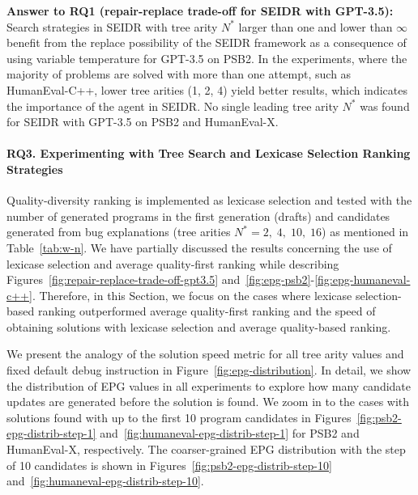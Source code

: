 \begin{framed}
\textbf{Answer to RQ1 (repair-replace trade-off for SEIDR with GPT-3.5):} 
Search strategies in SEIDR with tree arity $N^*$ larger than one and lower than $\infty$ benefit from the replace possibility of the SEIDR framework as a consequence of using variable temperature for GPT-3.5 on PSB2.
In the experiments, where the majority of problems are solved with more than one attempt, such as HumanEval-C++, lower tree arities (1, 2, 4) yield better results, which indicates the importance of the \debug{} agent in SEIDR. 
No single leading tree arity $N^*$ was found for SEIDR with GPT-3.5 on PSB2 and HumanEval-X.
\end{framed}



\paragraph{RQ3. Experimenting with Tree Search and Lexicase Selection Ranking Strategies}
\label{sec:seidr-lexicase-results}

Quality-diversity ranking is implemented as lexicase selection and tested with the number of generated programs in the first generation (drafts) and candidates generated from bug explanations (tree arities $N^*=2,\; 4, \; 10, \; 16$) as mentioned in Table~\ref{tab:w-n}.
We have partially discussed the results concerning the use of lexicase selection and average quality-first ranking while describing Figures~\ref{fig:repair-replace-trade-off-gpt3.5} and~\ref{fig:epg-psb2}-\ref{fig:epg-humaneval-c++}. 
Therefore, in this Section, we focus on the cases where lexicase selection-based ranking outperformed average quality-first ranking and the speed of obtaining solutions with lexicase selection and average quality-based ranking.

We present the analogy of the solution speed metric for all tree arity values and fixed default debug instruction in Figure~\ref{fig:epg-distribution}. 
In detail, we show the distribution of EPG values in all experiments to explore how many candidate updates are generated before the solution is found.
We zoom in to the cases with solutions found with up to the first 10 program candidates in Figures~\ref{fig:psb2-epg-distrib-step-1} and~\ref{fig:humaneval-epg-distrib-step-1} for PSB2 and HumanEval-X, respectively. 
The coarser-grained EPG distribution with the step of 10 candidates is shown in Figures~\ref{fig:psb2-epg-distrib-step-10} and~\ref{fig:humaneval-epg-distrib-step-10}. 

